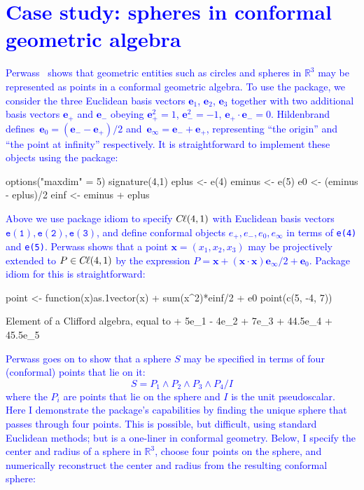 \documentclass{birkjour}
\theoremstyle{definition}
\theoremstyle{remark}
\numberwithin{equation}{section}
\newcommand{\cl}{C \kern -0.1em \ell}  %
\newcommand{\einf}{\mathbf{e}_\infty}
\newcommand{\ezero}{\mathbf{e}_0}
\newcommand{\bx}{\mathbf{x}}
\begin{document}
\section{\textcolor{blue}{Case study: spheres in conformal geometric algebra}}

\textcolor{blue}{
Perwass~\cite{perwass2009} shows that geometric entities such as
circles and spheres in $\mathbb{R}^3$ may be represented as points in
a conformal geometric algebra.  To use the package, we consider the
three Euclidean basis vectors $\mathbf{e}_1$, $\mathbf{e}_2$,
$\mathbf{e}_3$ together with two additional basis vectors
$\mathbf{e}_+$ and $\mathbf{e}_-$ obeying $\mathbf{e}_+^2=1$,
$\mathbf{e}_-^2=-1$, $\mathbf{e}_+\cdot\mathbf{e}_-=0$.
Hildenbrand~\cite{hildenbrand2013}
defines~$\ezero=\left(\mathbf{e}_--\mathbf{e}_+\right)/2$
and~$\einf=\mathbf{e}_- +\mathbf{e}_+$, representing ``the origin''
and ``the point at infinity'' respectively.  It is straightforward to
implement these objects using the package:}
\begin{Schunk}
\begin{Sinput}
options("maxdim" = 5)
signature(4,1)
eplus <- e(4)
eminus <- e(5)
e0 <- (eminus - eplus)/2
einf <- eminus + eplus
\end{Sinput}
\end{Schunk}
%
\textcolor{blue}{
Above we use package idiom to specify $\cl(4,1)$ with Euclidean basis
vectors $\mathtt{e(1),e(2),e(3)}$, and define conformal objects $e_+,
e_-, e_0,e_\infty$ in terms of {\tt e(4)} and {\tt e(5)}.  Perwass
shows that a point $\bx=(x_1,x_2,x_3)$ may be projectively extended to
$P\in\cl(4,1)$ by the expression $P = \bx+(\bx\cdot\bx)\einf/2
+\ezero$.  Package idiom for this is straightforward:}
\begin{Schunk}
\begin{Sinput}
point <- function(x){as.1vector(x) + sum(x^2)*einf/2 + e0}
point(c(5, -4, 7))
\end{Sinput}
\begin{Soutput}
Element of a Clifford algebra, equal to
+ 5e_1 - 4e_2 + 7e_3 + 44.5e_4 + 45.5e_5
\end{Soutput}
\end{Schunk}
%
\textcolor{blue}{
Perwass goes on to show that a sphere $S$ may be specified in terms of
four (conformal) points that lie on it:
%
\begin{equation}
  S = P_1\wedge P_2\wedge P_3\wedge P_4/ I
\end{equation}
%
where the $P_i$ are points that lie on the sphere and $I$ is the unit
pseudoscalar.  Here I demonstrate the package's capabilities by
finding the unique sphere that passes through four points.  This is
possible, but difficult, using standard Euclidean methods; but is a
one-liner in conformal geometry.  Below, I specify the center and
radius of a sphere in $\mathbb{R}^3$, choose four points on the
sphere, and numerically reconstruct the center and radius from the
resulting conformal sphere:}
\end{document}
